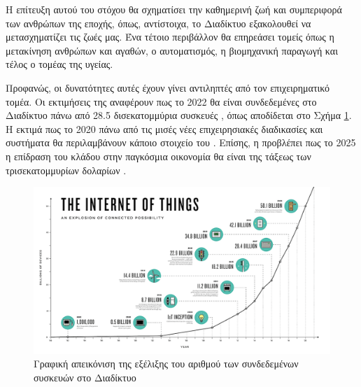 \par
Η επίτευξη αυτού του στόχου θα σχηματίσει την καθημερινή ζωή και συμπεριφορά των ανθρώπων της εποχής, όπως, αντίστοιχα, το Διαδίκτυο εξακολουθεί να μετασχηματίζει τις ζωές μας.
Ένα τέτοιο περιβάλλον θα επηρεάσει τομείς όπως η μετακίνηση ανθρώπων και αγαθών, ο αυτοματισμός, η βιομηχανική παραγωγή και τέλος ο τομέας της υγείας.
\par
Προφανώς, οι δυνατότητες αυτές έχουν γίνει αντιληπτές από τον επιχειρηματικό τομέα.
Οι εκτιμήσεις της  αναφέρουν πως το 2022 θα είναι συνδεδεμένες στο Διαδίκτυο πάνω από 28.5 δισεκατομμύρια συσκευές \cite{cisco2019}, όπως αποδίδεται στο Σχήμα \ref{iotnumb}.
H  εκτιμά πως το 2020 πάνω από τις μισές νέες επιχειρησιακές διαδικασίες και συστήματα θα περιλαμβάνουν κάποιο στοιχείο του  \cite{gartner2016}.
Επίσης, η  προβλέπει πως το 2025 η επίδραση του κλάδου στην παγκόσμια οικονομία θα είναι της τάξεως των τρισεκατομμυρίων δολαρίων \cite{mck2016}.

\begin{figure}[h!]
\includegraphics[scale=0.4]{images/IOT_numbes.png}
\centering
\caption{Γραφική απεικόνιση της εξέλιξης του αριθμού των συνδεδεμένων συσκευών στο Διαδίκτυο \cite{iotnumb}}	
\label{iotnumb}
\end{figure}

